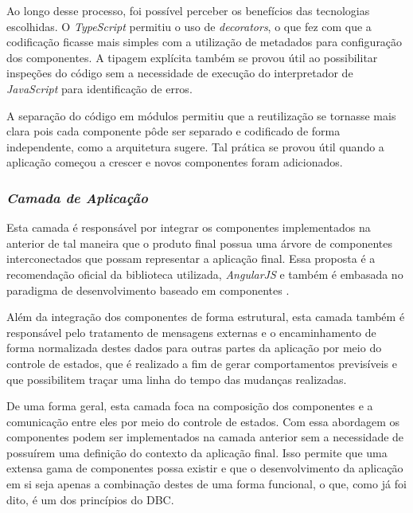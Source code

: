 Ao longo desse processo, foi possível perceber os benefícios das tecnologias escolhidas. O \textit{TypeScript} permitiu o uso de \textit{decorators}, o que fez com que a codificação ficasse mais simples com a utilização de metadados para configuração dos componentes. A tipagem explícita também se provou útil ao possibilitar inspeções do código sem a necessidade de execução do interpretador de \textit{JavaScript} para identificação de erros. 

A separação do código em módulos permitiu que a reutilização se tornasse mais clara pois cada componente pôde ser separado e codificado de forma independente, como a arquitetura sugere. Tal prática se provou útil quando a aplicação começou a crescer e novos componentes foram adicionados.


\subsubsection{{\it Camada de Aplicação}}

Esta camada é responsável por integrar os componentes implementados na anterior de tal maneira que o produto final possua uma árvore de componentes interconectados que possam representar a aplicação final. Essa proposta é a recomendação oficial da biblioteca utilizada, \textit{AngularJS} e também é embasada no paradigma de desenvolvimento baseado em componentes \cite{pressman2011}.

Além da integração dos componentes de forma estrutural, esta camada também é responsável pelo tratamento de mensagens externas e o encaminhamento de forma normalizada destes dados para outras partes da aplicação por meio do controle de estados, que é realizado a fim de gerar comportamentos previsíveis e que possibilitem traçar uma linha do tempo das mudanças realizadas.

De uma forma geral, esta camada foca na composição dos componentes e a comunicação entre eles por meio do controle de estados. Com essa abordagem os componentes podem ser implementados na camada anterior sem a necessidade de possuírem uma definição do contexto da aplicação final. Isso permite que uma extensa gama de componentes possa existir e que o desenvolvimento da aplicação em si seja apenas a combinação destes de uma forma funcional, o que, como já foi dito, é um dos princípios do DBC.

